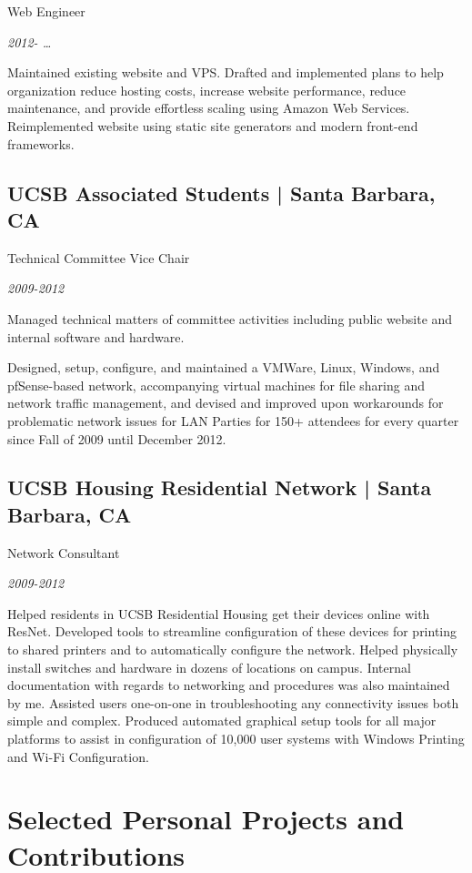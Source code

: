 \documentclass[10pt, letter]{article}
\newcommand{\years}[1]{\marginnote{#1}}
\renewcommand{\years}[1]{{\emph{#1}}}
\begin{document}
\begin{multicols}{2}
Web Engineer

\years{2012- \ldots}

Maintained existing website and VPS. Drafted and implemented plans to help
organization reduce hosting costs, increase website performance, reduce
maintenance, and provide effortless scaling using Amazon Web Services.
Reimplemented website using static site generators and modern front-end
frameworks.

\subsection*{UCSB Associated Students | {\footnotesize{Santa Barbara, CA}}}

Technical Committee Vice Chair

\years{2009-2012}

Managed technical matters of committee activities including public website
and internal software and hardware.

Designed, setup, configure, and maintained a VMWare, Linux, Windows, and
pfSense-based network, accompanying virtual machines for file sharing and
network traffic management, and devised and improved upon workarounds for
problematic network issues for LAN Parties for 150+ attendees for every
quarter since Fall of 2009 until December 2012.

\subsection*{UCSB Housing Residential Network | {\footnotesize{Santa Barbara, CA}}}

Network Consultant

\years{2009-2012}

Helped residents in UCSB Residential Housing get their devices online with
ResNet.  Developed tools to streamline configuration of these devices for
printing to shared printers and to automatically configure the network. Helped
physically install switches and hardware in dozens of locations on campus.
Internal documentation with regards to networking and procedures was also
maintained by me. Assisted users one-on-one in troubleshooting any connectivity
issues both simple and complex. Produced automated graphical setup tools for
all major platforms to assist in configuration of 10,000 user systems with
Windows Printing and Wi-Fi Configuration.

\section*{Selected Personal Projects and Contributions}


\end{multicols}
\end{document}
